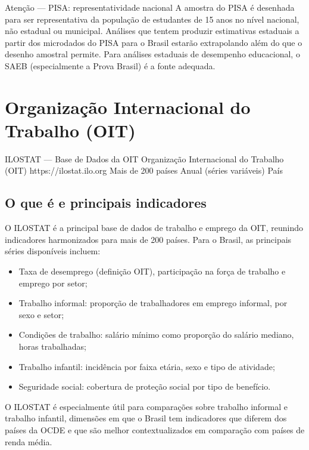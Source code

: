 \begin{boxatencao}{Atenção --- PISA: representatividade nacional}
A amostra do PISA é desenhada para ser representativa da população de estudantes de 15 anos no nível nacional, não estadual ou municipal. Análises que tentem produzir estimativas estaduais a partir dos microdados do PISA para o Brasil estarão extrapolando além do que o desenho amostral permite. Para análises estaduais de desempenho educacional, o SAEB (especialmente a Prova Brasil) é a fonte adequada.
\end{boxatencao}

\section{Organização Internacional do Trabalho (OIT)}

\ficharapida
  {ILOSTAT --- Base de Dados da OIT}
  {Organização Internacional do Trabalho (OIT)}
  {https://ilostat.ilo.org}
  {Mais de 200 países}
  {Anual (séries variáveis)}
  {País}

\subsection{O que é e principais indicadores}

O ILOSTAT é a principal base de dados de trabalho e emprego da OIT, reunindo indicadores harmonizados para mais de 200 países. Para o Brasil, as principais séries disponíveis incluem:

\begin{itemize}
  \item Taxa de desemprego (definição OIT), participação na força de trabalho e emprego por setor;
  \item Trabalho informal: proporção de trabalhadores em emprego informal, por sexo e setor;
  \item Condições de trabalho: salário mínimo como proporção do salário mediano, horas trabalhadas;
  \item Trabalho infantil: incidência por faixa etária, sexo e tipo de atividade;
  \item Seguridade social: cobertura de proteção social por tipo de benefício.
\end{itemize}

O ILOSTAT é especialmente útil para comparações sobre trabalho informal e trabalho infantil, dimensões em que o Brasil tem indicadores que diferem dos países da OCDE e que são melhor contextualizados em comparação com países de renda média.

